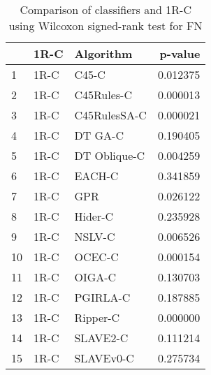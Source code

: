 \begin{table}
\footnotesize
\caption{Comparison of classifiers and 1R-C using Wilcoxon signed-rank test for FN}
\label{tab:1R-C wilcoxon FN comparison}
\begin{tabular}{lllr}
\hline
 & 1R-C & Algorithm & p-value \\
\hline
1 & 1R-C & C45-C & 0.012375 \\
2 & 1R-C & C45Rules-C & 0.000013 \\
3 & 1R-C & C45RulesSA-C & 0.000021 \\
4 & 1R-C & DT GA-C & 0.190405 \\
5 & 1R-C & DT Oblique-C & 0.004259 \\
6 & 1R-C & EACH-C & 0.341859 \\
7 & 1R-C & GPR & 0.026122 \\
8 & 1R-C & Hider-C & 0.235928 \\
9 & 1R-C & NSLV-C & 0.006526 \\
10 & 1R-C & OCEC-C & 0.000154 \\
11 & 1R-C & OIGA-C & 0.130703 \\
12 & 1R-C & PGIRLA-C & 0.187885 \\
13 & 1R-C & Ripper-C & 0.000000 \\
14 & 1R-C & SLAVE2-C & 0.111214 \\
15 & 1R-C & SLAVEv0-C & 0.275734 \\
\hline
\end{tabular}
\end{table}
